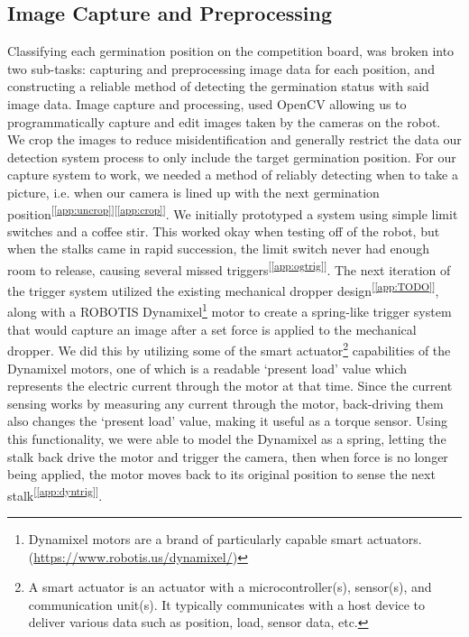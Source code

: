 \documentclass[11pt, twoside]{report}
\newcommand{\refapp}[1]{\textsuperscript{[\ref{#1}]}}
\begin{document}
\subsection{Image Capture and Preprocessing}
Classifying each germination position on the competition board, was broken into two sub-tasks: capturing and preprocessing image data for each position, and constructing a reliable method of detecting the germination status with said image data. Image capture and processing, used OpenCV  allowing us to programmatically capture and edit images taken by the cameras on the robot. We crop the images to reduce misidentification and generally restrict the data our detection system process to only include the target germination position. For our capture system to work, we needed a method of reliably detecting when to take a picture, i.e. when our camera is lined up with the next germination position\refapp{app:uncrop}\refapp{app:crop}. We initially prototyped a system using simple limit switches and a coffee stir. This worked okay when testing off of the robot, but when the stalks came in rapid succession, the limit switch never had enough room to release, causing several missed triggers\refapp{app:ogtrig}. The next iteration of the trigger system utilized the existing mechanical dropper design\refapp{app:TODO}, along with a ROBOTIS Dynamixel\footnote{Dynamixel motors are a brand of particularly capable smart actuators. (\url{https://www.robotis.us/dynamixel/})} motor to create a spring-like trigger system that would capture an image after a set force is applied to the mechanical dropper. We did this by utilizing some of the smart actuator\footnote{A smart actuator is an actuator with a microcontroller(s), sensor(s), and communication unit(s). It typically communicates with a host device to deliver various data such as position, load, sensor data, etc.} capabilities of the Dynamixel motors, one of which is a readable ‘present load’ value which represents the electric current through the motor at that time. Since the current sensing works by measuring any current through the motor, back-driving them also changes the ‘present load’ value, making it useful as a torque sensor. Using this functionality, we were able to model the Dynamixel as a spring, letting the stalk back drive the motor and trigger the camera, then when force is no longer being applied, the motor moves back to its original position to sense the next stalk\refapp{app:dyntrig}.
\end{document}
